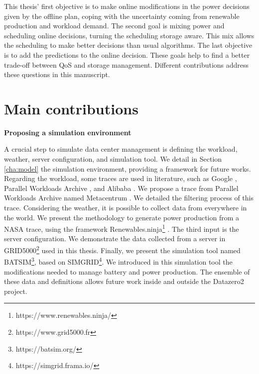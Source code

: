 This thesis' first objective is to make online modifications in the power decisions given by the offline plan, coping with the uncertainty coming from renewable production and workload demand. The second goal is mixing power and scheduling online decisions, turning the scheduling storage aware. This mix allows the scheduling to make better decisions than usual algorithms. The last objective is to add the predictions to the online decision. These goals help to find a better trade-off between QoS and storage management. Different contributions address these questions in this manuscript.

\section{Main contributions}

\begin{center}
    \textbf{Proposing a simulation environment}
\end{center}
A crucial step to simulate data center management is defining the workload, weather, server configuration, and simulation tool. We detail in Section \ref{cha:model} the simulation environment, providing a framework for future works. Regarding the workload, some traces are used in literature, such as Google \cite{reiss2011google}, Parallel Workloads Archive \cite{feitelson2014experience}, and Alibaba \cite{wang2022characterizing}. We propose a trace from Parallel Workloads Archive named Metacentrum \cite{klusavcek2017real}. We detailed the filtering process of this trace. Considering the weather, it is possible to collect data from everywhere in the world. We present the methodology to generate power production from a NASA trace, using the framework Renewables.ninja\footnote{https://www.renewables.ninja/} \cite{pfenninger2016long}. The third input is the server configuration. We demonstrate the data collected from a server in GRID5000\footnote{https://www.grid5000.fr} used in this thesis. Finally, we present the simulation tool named BATSIM\footnote{https://batsim.org/}, based on SIMGRID\footnote{https://simgrid.frama.io/}. We introduced in this simulation tool the modifications needed to manage battery and power production. The ensemble of these data and definitions allows future work inside and outside the Datazero2 project.

